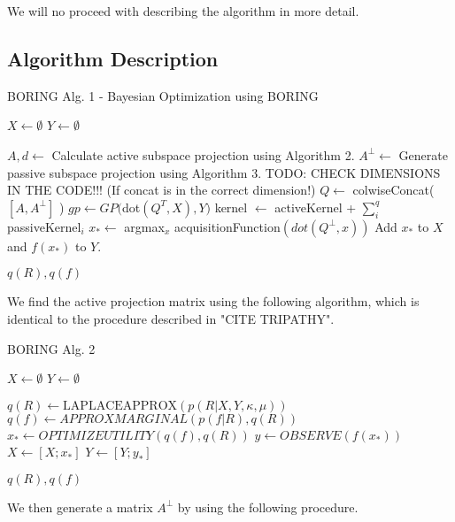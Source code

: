 We will no proceed with describing the algorithm in more detail.

\subsection{Algorithm Description}

\begin{algorithm}
\caption{BORING Alg. 1 - Bayesian Optimization using BORING}

\begin{algorithmic} 
\STATE $X \leftarrow \emptyset$
\STATE $Y \leftarrow \emptyset$

\STATE $A, d \leftarrow $ Calculate active subspace projection using Algorithm 2.
\STATE $A^{\bot} \leftarrow $ Generate passive subspace projection using Algorithm 3.
\STATE TODO: CHECK DIMENSIONS IN THE CODE!!! (If concat is in the correct dimension!)
\STATE $Q \leftarrow $ colwiseConcat( $[A, A^{\bot}]$ ) 
\STATE $gp \leftarrow GP( $dot$( Q^T, X), Y)$
\STATE kernel $\leftarrow$ activeKernel + $\sum_i^{q}$ passiveKernel$_i$
\STATE $x_* \leftarrow $ argmax$_x$ acquisitionFunction$(dot(Q^{\bot}, x) )$
\STATE Add $x_*$ to $X$ and $ f(x_*)$ to $Y$.
\ENDWHILE

\RETURN $q(R), q(f)$
\end{algorithmic}

\end{algorithm}

We find the active projection matrix using the following algorithm, which is identical to the procedure described in "CITE TRIPATHY".

\begin{algorithm}
\caption{BORING Alg. 2} 

\begin{algorithmic} 
\STATE $X \leftarrow \emptyset$
\STATE $Y \leftarrow \emptyset$

\STATE $ q(R) \leftarrow \text{LAPLACEAPPROX}( p(R | X, Y, \kappa, \mu) ) $
\STATE $ q(f) \leftarrow  APPROXMARGINAL( p(f | R), q(R)) $
\STATE $ x_* \leftarrow OPTIMIZEUTILITY( q(f), q(R) )$
\STATE $ y \leftarrow OBSERVE( f( x_* ) ) $
\STATE $ X \leftarrow [X; x_*] $
\STATE $ Y \leftarrow[Y; y_*] $
\ENDWHILE

\RETURN $q(R), q(f)$
\end{algorithmic}
\end{algorithm}

We then generate a matrix $ A^{\bot} $ by using the following procedure.

